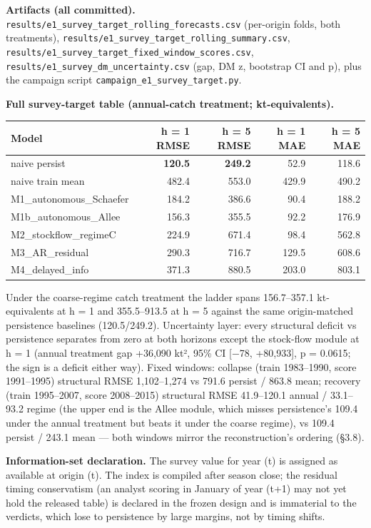\documentclass[11pt]{article}
\begin{document}
\textbf{Artifacts (all committed).}
\texttt{results/e1\_survey\_target\_rolling\_forecasts.csv} (per-origin
folds, both treatments),
\texttt{results/e1\_survey\_target\_rolling\_summary.csv},
\texttt{results/e1\_survey\_target\_fixed\_window\_scores.csv},
\texttt{results/e1\_survey\_dm\_uncertainty.csv} (gap, DM z, bootstrap
CI and p), plus the campaign script
\texttt{campaign\_e1\_survey\_target.py}.

\textbf{Full survey-target table (annual-catch treatment;
kt-equivalents).}

{\def\LTcaptype{none} %
\begin{longtable}[]{@{}lrrrr@{}}
\toprule\noalign{}
Model & h = 1 RMSE & h = 5 RMSE & h = 1 MAE & h = 5 MAE \\
\midrule\noalign{}
\endhead
\bottomrule\noalign{}
\endlastfoot
naive persist & \textbf{120.5} & \textbf{249.2} & 52.9 & 118.6 \\
naive train mean & 482.4 & 553.0 & 429.9 & 490.2 \\
M1\_autonomous\_Schaefer & 184.2 & 386.6 & 90.4 & 188.2 \\
M1b\_autonomous\_Allee & 156.3 & 355.5 & 92.2 & 176.9 \\
M2\_stockflow\_regimeC & 224.9 & 671.4 & 98.4 & 562.8 \\
M3\_AR\_residual & 290.3 & 716.7 & 129.5 & 608.6 \\
M4\_delayed\_info & 371.3 & 880.5 & 203.0 & 803.1 \\
\end{longtable}
}

Under the coarse-regime catch treatment the ladder spans 156.7--357.1
kt-equivalents at h = 1 and 355.5--913.5 at h = 5 against the same
origin-matched persistence baselines (120.5/249.2). Uncertainty layer:
every structural deficit vs persistence separates from zero at both
horizons except the stock-flow module at h = 1 (annual treatment gap
+36,090 kt², 95\% CI {[}−78, +80,933{]}, p = 0.0615; the sign is a
deficit either way). Fixed windows: collapse (train 1983--1990, score
1991--1995) structural RMSE 1,102--1,274 vs 791.6 persist / 863.8 mean;
recovery (train 1995--2007, score 2008--2015) structural RMSE
41.9--120.1 annual / 33.1--93.2 regime (the upper end is the Allee
module, which misses persistence's 109.4 under the annual treatment but
beats it under the coarse regime), vs 109.4 persist / 243.1 mean ---
both windows mirror the reconstruction's ordering (§3.8).

\textbf{Information-set declaration.} The survey value for year (t) is
assigned as available at origin (t). The index is compiled after season
close; the residual timing conservatism (an analyst scoring in January
of year (t+1) may not yet hold the released table) is declared in the
frozen design and is immaterial to the verdicts, which lose to
persistence by large margins, not by timing shifts.
\end{document}
